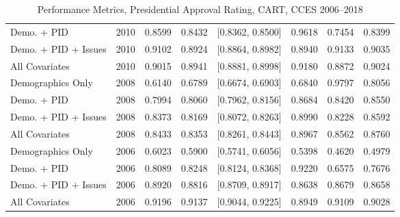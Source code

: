 \begin{table}[ht]
\begin{tabular}{lrrrlrrr}
  Demo. + PID & 2010 & 0.8599 & 0.8432 & [0.8362, 0.8500] & 0.9618 & 0.7454 & 0.8399 \\ 
  Demo. + PID + Issues & 2010 & 0.9102 & 0.8924 & [0.8864, 0.8982] & 0.8940 & 0.9133 & 0.9035 \\ 
  All Covariates & 2010 & 0.9015 & 0.8941 & [0.8881, 0.8998] & 0.9180 & 0.8872 & 0.9024 \\ 
  Demographics Only & 2008 & 0.6140 & 0.6789 & [0.6674, 0.6903] & 0.6840 & 0.9797 & 0.8056 \\ 
  Demo. + PID & 2008 & 0.7994 & 0.8060 & [0.7962, 0.8156] & 0.8684 & 0.8420 & 0.8550 \\ 
  Demo. + PID + Issues & 2008 & 0.8373 & 0.8169 & [0.8072, 0.8263] & 0.8990 & 0.8228 & 0.8592 \\ 
  All Covariates & 2008 & 0.8433 & 0.8353 & [0.8261, 0.8443] & 0.8967 & 0.8562 & 0.8760 \\ 
  Demographics Only & 2006 & 0.6023 & 0.5900 & [0.5741, 0.6056] & 0.5398 & 0.4620 & 0.4979 \\ 
  Demo. + PID & 2006 & 0.8089 & 0.8248 & [0.8124, 0.8368] & 0.9220 & 0.6575 & 0.7676 \\ 
  Demo. + PID + Issues & 2006 & 0.8920 & 0.8816 & [0.8709, 0.8917] & 0.8638 & 0.8679 & 0.8658 \\ 
  All Covariates & 2006 & 0.9196 & 0.9137 & [0.9044, 0.9225] & 0.8949 & 0.9109 & 0.9028 \\ 
   \bottomrule
\end{tabular}
\caption{Performance Metrics, Presidential Approval Rating, CART, CCES 2006--2018} 
\label{tab:cces_presapprov_cart}
\end{table}
